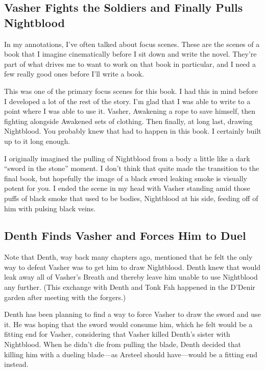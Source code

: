 \subsection*{Vasher Fights the Soldiers and Finally Pulls Nightblood}

In my annotations, I’ve often talked about focus scenes. These are the scenes of a book that I imagine cinematically before I sit down and write the novel. They’re part of what drives me to want to work on that book in particular, and I need a few really good ones before I’ll write a book.

This was one of the primary focus scenes for this book. I had this in mind before I developed a lot of the rest of the story. I’m glad that I was able to write to a point where I was able to use it. Vasher, Awakening a rope to save himself, then fighting alongside Awakened sets of clothing. Then finally, at long last, drawing Nightblood. You probably knew that had to happen in this book. I certainly built up to it long enough.

I originally imagined the pulling of Nightblood from a body a little like a dark “sword in the stone” moment. I don’t think that quite made the transition to the final book, but hopefully the image of a black sword leaking smoke is visually potent for you. I ended the scene in my head with Vasher standing amid those puffs of black smoke that used to be bodies, Nightblood at his side, feeding off of him with pulsing black veins.

\subsection*{Denth Finds Vasher and Forces Him to Duel}

Note that Denth, way back many chapters ago, mentioned that he felt the only way to defeat Vasher was to get him to draw Nightblood. Denth knew that would leak away all of Vasher’s Breath and thereby leave him unable to use Nightblood any further. (This exchange with Denth and Tonk Fah happened in the D’Denir garden after meeting with the forgers.)

Denth has been planning to find a way to force Vasher to draw the sword and use it. He was hoping that the sword would consume him, which he felt would be a fitting end for Vasher, considering that Vasher killed Denth’s sister with Nightblood. When he didn’t die from pulling the blade, Denth decided that killing him with a dueling blade—as Arsteel should have—would be a fitting end instead.



